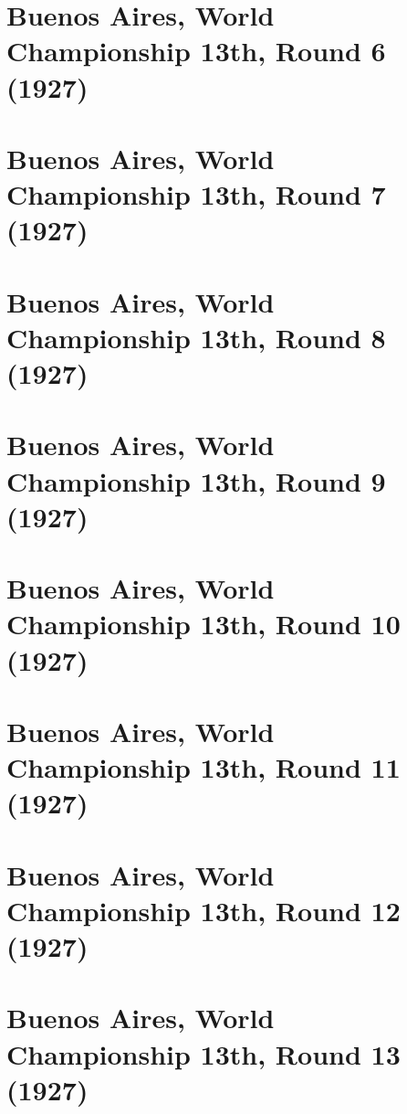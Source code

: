 \documentclass[11pt]{article}
\begin{document}
\clearpage

\section{Buenos Aires, World Championship 13th, Round 6 (1927)}


\clearpage

\section{Buenos Aires, World Championship 13th, Round 7 (1927)}


\clearpage

\section{Buenos Aires, World Championship 13th, Round 8 (1927)}


\clearpage

\section{Buenos Aires, World Championship 13th, Round 9 (1927)}


\clearpage

\section{Buenos Aires, World Championship 13th, Round 10 (1927)}


\clearpage

\section{Buenos Aires, World Championship 13th, Round 11 (1927)}


\clearpage

\section{Buenos Aires, World Championship 13th, Round 12 (1927)}


\clearpage

\section{Buenos Aires, World Championship 13th, Round 13 (1927)}

\end{document}
